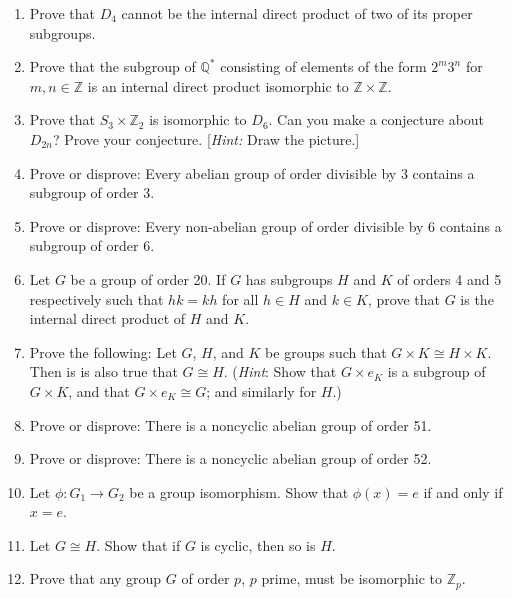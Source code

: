 {\begin{enumerate}[(1)]
\begin{enumerate}
\end{enumerate}
 

\item
Prove that $D_4$ cannot be the internal direct product of two of its
proper subgroups. 
 

\item
Prove that the subgroup of ${\mathbb Q}^\ast$ consisting of elements of
the form $2^m 3^n$ for $m,n \in {\mathbb Z}$ is an internal direct
product isomorphic to ${\mathbb Z} \times {\mathbb Z}$.
 

\item
Prove that $S_3 \times {\mathbb Z}_2$ is isomorphic to $D_6$. Can you
make a conjecture about $D_{2n}$? Prove your conjecture. [{\em Hint:\/}
Draw the picture.] 
 

\item
Prove or disprove: Every abelian group of order divisible by 3
contains a subgroup of order 3.  


\item
Prove or disprove: Every non-abelian group of order divisible by 6
contains a subgroup of order 6. 
 

\item
Let $G$ be a group of order 20. If $G$ has subgroups $H$ and $K$ of
orders 4 and 5 respectively such that $hk = kh$ for all $h \in H$ and
$k \in K$, prove that $G$ is the internal direct product of $H$ and $K$. 
 

\item
Prove the following: Let $G$, $H$, and $K$ be
groups such that $G \times K \cong H \times K$. Then is is also true that $G \cong H$. 
(\emph{Hint}: Show that $G \times e_K$ is a subgroup of $G \times K$, and that $G \times e_K \cong G$; and similarly for $H$.)
 

\item
Prove or disprove: There is a noncyclic abelian group of order 51. 
 

\item
Prove or disprove: There is a noncyclic abelian group of order 52. 
 
 

\item
Let $\phi : G_1 \rightarrow G_2$ be a group isomorphism. Show that
$\phi( x) = e$ if and only if $x=e$. 
 

\item
Let $G \cong H$. Show that if $G$ is cyclic, then so is $H$.
 

\item
Prove that any group $G$ of order $p$, $p$  prime, must be isomorphic
to ${\mathbb Z}_p$. 
 


\end{enumerate}}
